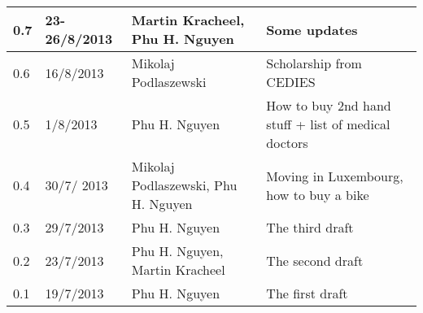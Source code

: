 \begin{center}
\begin{table*}[t!]
\begin{tabular}{ | l | l | p{3cm} | p{6cm} |}
  0.7 & 23-26/8/2013 & Martin Kracheel, Phu H. Nguyen & Some updates \\  \hline
  0.6 & 16/8/2013 & Mikolaj Podlaszewski & Scholarship from CEDIES \\  \hline
  0.5 & 1/8/2013 & Phu H. Nguyen & How to buy 2nd hand stuff + list of medical doctors \\  \hline
  0.4 & 30/7/ 2013 & Mikolaj Podlaszewski, Phu H. Nguyen & Moving in Luxembourg, how to buy a bike \\  \hline
  0.3 & 29/7/2013 & Phu H. Nguyen & The third draft \\    \hline
  0.2 & 23/7/2013 & Phu H. Nguyen, Martin Kracheel & The second draft \\  \hline
  0.1 & 19/7/2013 & Phu H. Nguyen & The first draft \\ \hline
	\end{tabular}
	\label{tab:Revisions}

\end{table*}
\end{center}